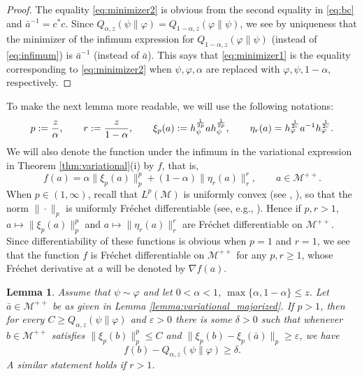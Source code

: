 \documentclass[12pt]{article}
\newtheorem{lemma}[theorem]{Lemma}
\theoremstyle{definition}
\theoremstyle{remark}
\numberwithin{equation}{section}
\def\Me{\mathcal M}
\def\ffi{\varphi}
\def\eps{\varepsilon}
\begin{document}
\begin{proof}
The equality  \eqref{eq:minimizer2} is obvious from the second equality in \eqref{eq:bc} and
$\bar a^{-1}=c^*c$. Since $Q_{\alpha,z}(\psi\|\ffi)=Q_{1-\alpha,z}(\ffi\|\psi)$, we see by uniqueness that
the minimizer of the infimum expression for $Q_{1-\alpha,z}(\ffi\|\psi)$ (instead of \eqref{eq:infimum}) is
$\bar a^{-1}$ (instead of $\bar a$). This says that \eqref{eq:minimizer1} is the equality corresponding to
\eqref{eq:minimizer2} when $\psi,\ffi,\alpha$ are replaced with $\ffi,\psi,1-\alpha$, respectively. 
\end{proof}

To make the next lemma more readable, we will use the following notations:
\[
p:={z\over\alpha},\qquad r:={z\over 1-\alpha},\qquad
\xi_p(a):=h_\psi^{1\over2p}ah_\psi^{1\over 2p},\qquad
\eta_r(a)=h_\ffi^{1\over2r}a^{-1}h_\ffi^{1\over 2r}.
\]
We will also denote the function under the infimum in the variational expression in
Theorem \ref{thm:variational}(i) by $f$, that is,
\begin{equation}\label{func-variational}
f(a)=\alpha\|\xi_p(a)\|_p^p
+(1-\alpha)\|\eta_r(a)\|_r^r,\qquad a\in \Me^{++}.
\end{equation}
{When $p\in(1,\infty)$, recall that $L^p(\Me)$ is uniformly convex (see
\cite{haagerup1979lpspaces}, \cite[Theorem 4.2]{kosaki1984applications}), so that the norm
$\|\cdot\|_p$ is uniformly Fr\'echet differentiable (see, e.g.,
\cite[Part 3, Chap.~II]{beauzamy1982introduction}). Hence if $p,r>1$, $a\mapsto\|\xi_p(a)\|_p^p$
and $a\mapsto\|\eta_r(a)\|_r^r$ are Fr\'echet differentiable on $\Me^{++}$. Since differentiability of
these functions is obvious when $p=1$ and $r=1$, we see that the function $f$ is Fr\'echet differentiable
on $\Me^{++}$ for any $p,r\ge1$, whose Fr\'echet derivative at $a$ will be denoted by $\nabla f(a)$.}

\begin{lemma}\label{lemma:variational_majorized2}
Assume that $\psi\sim\ffi$  and let $0<\alpha<1$, $\max\{\alpha,1-\alpha\}\le z$. {Let
$\bar a\in\Me^{++}$ be as given in Lemma \ref{lemma:variational_majorized}.} If $p>1$, then for
every $C\ge Q_{\alpha,z}(\psi\|\ffi)$ and $\eps>0$ there is some $\delta>0$ such that whenever
{$b\in\Me^{++}$ satisfies}
$\|\xi_p(b)\|^p_p\le C$ and $\|\xi_p(b)-\xi_p(\bar a)\|_p\ge \eps$, we have
\[
f(b)-Q_{\alpha,z}(\psi\|\ffi)\ge \delta.
\]
A similar statement holds if $r>1$.
\end{lemma}
\end{document}
